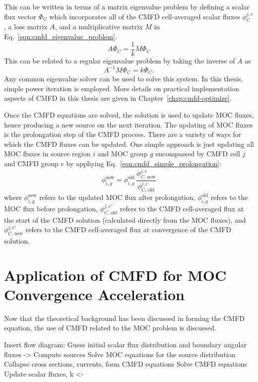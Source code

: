 This can be written in terms of a matrix eigenvalue problem by defining a scalar flux vector $\Phi_C$ which incorporates all of the CMFD cell-averaged scalar fluxes $\phi_C^{j,e}$, a loss matrix $A$, and a multiplicative matrix $M$ in Eq.~\ref{eqn:cmfd_eigenvalue_problem}.
\begin{equation}
	A \Phi_C = \frac{1}{k} M \Phi_C
	\label{eqn:cmfd_eigenvalue_problem}
\end{equation}
This can be related to a regular eigenvalue problem by taking the inverse of $A$ as
\begin{equation}
	A^{-1} M \Phi_C = k \Phi_C.
\end{equation}
Any common eigenvalue solver can be used to solve this system. In this thesis, simple power iteration is employed. More details on practical implementation aspects of CMFD in this thesis are given in Chapter~\ref{chap:cmfd-optimize}.

Once the CMFD equations are solved, the solution is used to update MOC fluxes, hence producing a new source on the next iteration. The updating of MOC fluxes is the prolongation step of the CMFD process. There are a variety of ways for which the CMFD fluxes can be updated. One simple approach is just updating all MOC fluxes in source region $i$ and MOC group $g$ encompassed by CMFD cell $j$ and CMFD group $e$ by appliying Eq.~\ref{eqn:cmfd_simple_prolongation}:
\begin{equation}
\phi_{i,g}^{\text{new}} = \phi_{i,g}^{\text{old}} \, \frac{\phi_{C, \, \text{new}}^{j,e}}{\phi_{C, \, \text{old}}^{j,e}}
\label{eqn:cmfd_simple_prolongation}
\end{equation}
where $\phi_{i,g}^{\text{new}}$ refers to the updated MOC flux after prolongation, $\phi_{i,g}^{\text{old}}$ refers to the MOC flux before prolongation, $\phi_{C, \, \text{old}}^{j,e'}$ refers to the CMFD cell-averaged flux at the start of the CMFD solution (calculated directly from the MOC fluxes), and $\phi_{C, \, \text{new}}^{j,e'}$ refers to the CMFD cell-averaged flux at convergence of the CMFD solution.

\section{Application of CMFD for MOC Convergence Acceleration}
Now that the theoretical background has been discussed in forming the CMFD equation, the use of CMFD related to the MOC problem is discussed.


Insert flow diagram:
Guess initial scalar flux distribution and boundary angular fluxes
->
Compute sources
Solve MOC equations for the source distribution
Collapse cross sections, currents, form CMFD equations
Solve CMFD equations
Update scalar fluxes, k
<-